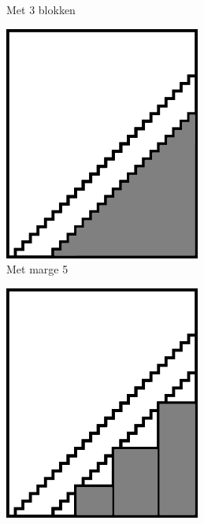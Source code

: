 \begin{figure}[]
\begin{subfigure}{.22\textwidth}
  \caption{Met 3 blokken}
  \label{fig:orthogonality_compression_visual_blocks}
\end{subfigure}
\begin{subfigure}{.22\textwidth}
  \centering
  \includegraphics[width=0.9\linewidth]{images/orthogonality_compression3.png}
  \caption{Met marge 5}
  \label{fig:orthogonality_compression_visual_margin}
\end{subfigure}
\begin{subfigure}{.22\textwidth}
  \centering
  \includegraphics[width=0.9\linewidth]{images/orthogonality_compression4.png}

\end{subfigure}
\end{figure}
